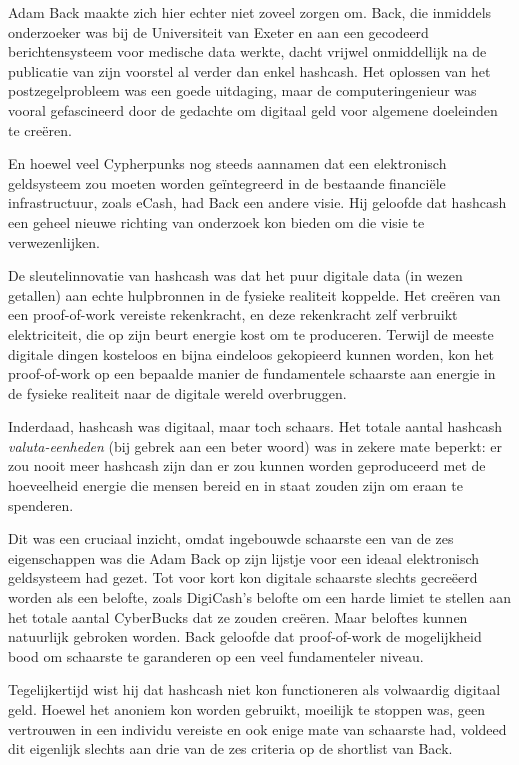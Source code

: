 \documentclass[
  a5paper,
  smalldemyvopaper,11pt,twoside,onecolumn,openright,extrafontsizes,
hidelinks]{memoir}
\begin{document}
Adam Back maakte zich hier echter niet zoveel zorgen om. Back, die
inmiddels onderzoeker was bij de Universiteit van Exeter en aan een
gecodeerd berichtensysteem voor medische data werkte, dacht vrijwel
onmiddellijk na de publicatie van zijn voorstel al verder dan enkel
hashcash. Het oplossen van het postzegelprobleem was een goede
uitdaging, maar de computeringenieur was vooral gefascineerd door de
gedachte om digitaal geld voor algemene doeleinden te creëren.

En hoewel veel Cypherpunks nog steeds aannamen dat een elektronisch
geldsysteem zou moeten worden geïntegreerd in de bestaande financiële
infrastructuur, zoals eCash, had Back een andere visie. Hij geloofde dat
hashcash een geheel nieuwe richting van onderzoek kon bieden om die
visie te verwezenlijken.

De sleutelinnovatie van hashcash was dat het puur digitale data (in
wezen getallen) aan echte hulpbronnen in de fysieke realiteit koppelde.
Het creëren van een proof-of-work vereiste rekenkracht, en deze
rekenkracht zelf verbruikt elektriciteit, die op zijn beurt energie kost
om te produceren. Terwijl de meeste digitale dingen kosteloos en bijna
eindeloos gekopieerd kunnen worden, kon het proof-of-work op een
bepaalde manier de fundamentele schaarste aan energie in de fysieke
realiteit naar de digitale wereld overbruggen.

Inderdaad, hashcash was digitaal, maar toch schaars. Het totale aantal
hashcash \emph{valuta-eenheden} (bij gebrek aan een beter woord) was in
zekere mate beperkt: er zou nooit meer hashcash zijn dan er zou kunnen
worden geproduceerd met de hoeveelheid energie die mensen bereid en in
staat zouden zijn om eraan te spenderen.

Dit was een cruciaal inzicht, omdat ingebouwde schaarste een van de zes
eigenschappen was die Adam Back op zijn lijstje voor een ideaal
elektronisch geldsysteem had gezet. Tot voor kort kon digitale schaarste
slechts gecreëerd worden als een belofte, zoals DigiCash's belofte om
een harde limiet te stellen aan het totale aantal CyberBucks dat ze
zouden creëren. Maar beloftes kunnen natuurlijk gebroken worden. Back
geloofde dat proof-of-work de mogelijkheid bood om schaarste te
garanderen op een veel fundamenteler niveau.

Tegelijkertijd wist hij dat hashcash niet kon functioneren als
volwaardig digitaal geld. Hoewel het anoniem kon worden gebruikt,
moeilijk te stoppen was, geen vertrouwen in een individu vereiste en ook
enige mate van schaarste had, voldeed dit eigenlijk slechts aan drie van
de zes criteria op de shortlist van Back.
\end{document}
